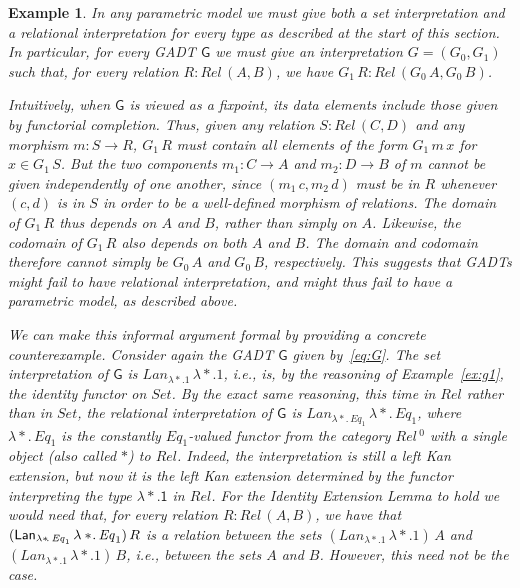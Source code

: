 \documentclass[submission,copyright,creativecommons]{eptcs}
\newtheorem{example}[thm]{Example}
\begin{document}
\begin{example}\label{ex:prim-par}
In any parametric model we must give both a set interpretation and a
relational interpretation for every type as described at the start of
this section. In particular, for every GADT $\mathsf{G}$ we must give
an interpretation $G = (G_0,G_1)$ such that, for every relation $R :
\mathit{Rel}\,(A, B)$, we have $G_1\,R : \mathit{Rel}\,(G_0\,A,
G_0\,B)$.

Intuitively, when $\mathsf{G}$ is viewed as a fixpoint, its data
elements include those given by functorial completion. Thus, given any
relation $S : \mathit{Rel}\,(C, D)$ and any morphism $m : S \to R$,
$G_1\, R$ must contain all elements of the form $G_1\,m\,x$ for $x \in
G_1\,S$.  But the two components $m_1 : C \to A$ and $m_2 : D \to B$
of $m$ cannot be given independently of one another, since
$(m_1\,c, m_2\,d)$ must be in $R$ whenever $(c,d)$ is in $S$ in order
to be a well-defined morphism of relations.  The domain of $G_1\, R$
thus depends on $A$ {\em and} $B$, rather than simply on $A$.
Likewise, the codomain of $G_1\,R$ also depends on both $A$ and $B$.
The domain and codomain therefore cannot simply be $G_0\, A$ and
$G_0\, B$, respectively.  This suggests that GADTs might fail to have
relational interpretation, and might thus fail to have a parametric
model, as described above.

We can make this informal argument formal by providing a concrete
counterexample.  Consider again the GADT $\mathsf{G}$ given
by~\eqref{eq:G}. The set interpretation of $\mathsf{G}$ is
$\mathit{Lan}_{\lambda *\!. 1}\,\lambda *\!. 1$, i.e., is, by the
reasoning of Example~\ref{ex:g1}, the identity functor on
$\mathit{Set}$. By the exact same reasoning, this time in
$\mathit{Rel}$ rather than in $\mathit{Set}$, the relational
interpretation of $\mathsf{G}$ is $\mathit{Lan}_{\lambda
  *\!.\,\mathit{Eq}_1} \,\lambda *\!.\,\mathit{Eq}_1$, where $\lambda
*\!.\,\mathit{Eq}_1$ is the constantly $\mathit{Eq}_1$-valued functor
from the category $\mathit{Rel}\,^0$ with a single object (also called
$*$) to $\mathit{Rel}$.  Indeed, the interpretation is still a left
Kan extension, but now it is the left Kan extension determined by the
functor interpreting the type $\mathsf{\lambda *\!. 1}$ in
$\mathit{Rel}$. For the Identity Extension Lemma to hold we would need
that, for every relation $R : \mathit{Rel}\,(A, B)$, we have that
$(\mathit{\mathsf{Lan}}_{\lambda *\!.\,\mathit{Eq}_1} \,\lambda
*\!.\,\mathit{Eq}_1)\, R$ is a relation between the sets
$(\mathit{Lan}_{\lambda *. 1}\,\lambda *\!. 1)\, A$ and
$(\mathit{Lan}_{\lambda *. 1}\,\lambda *\!. 1)\,B$, i.e., between the
sets $A$ and $B$. However,
this need not be the case.


\end{example}
\end{document}
